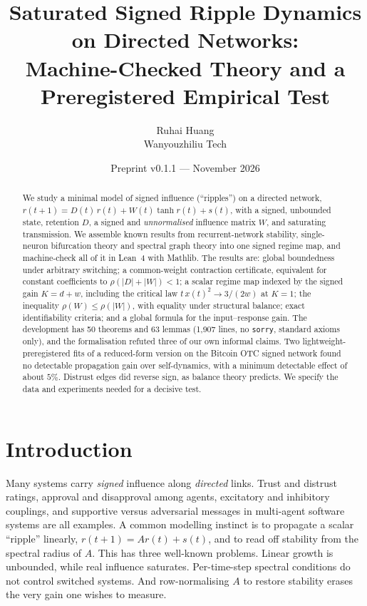 \documentclass[11pt]{article}
\title{Saturated Signed Ripple Dynamics on Directed Networks:\\
Machine-Checked Theory and a Preregistered Empirical Test}
\author{Ruhai Huang\\ \small Wanyouzhiliu Tech}
\date{Preprint v0.1.1 --- November 2026}
\theoremstyle{definition}
\theoremstyle{remark}
\begin{document}
\maketitle

\begin{abstract}
We study a minimal model of signed influence (``ripples'') on a directed network,
$r(t+1)=D(t)\,r(t)+W(t)\tanh r(t)+s(t)$, with a signed, unbounded state, retention $D$, a signed and
\emph{unnormalised} influence matrix $W$, and saturating transmission. We assemble known results from
recurrent-network stability, single-neuron bifurcation theory and spectral graph theory into one signed
regime map, and machine-check all of it in Lean~4 with Mathlib. The results are: global boundedness
under arbitrary switching; a common-weight contraction certificate, equivalent for constant
coefficients to $\rho(|D|+|W|)<1$; a scalar regime map indexed by the signed gain $K=d+w$, including the
critical law $t\,x(t)^2\to3/(2w)$ at $K=1$; the inequality $\rho(W)\le\rho(|W|)$, with equality under
structural balance; exact identifiability criteria; and a global formula for the input--response gain.
The development has 50 theorems and 63 lemmas (1{,}907 lines, no \texttt{sorry}, standard axioms only),
and the formalisation refuted three of our own informal claims. Two lightweight-preregistered fits of a
reduced-form version on the Bitcoin OTC signed network found no detectable propagation gain over
self-dynamics, with a minimum detectable effect of about $5\%$. Distrust edges did reverse sign, as
balance theory predicts. We specify the data and experiments needed for a decisive test.
\end{abstract}

\section{Introduction}

Many systems carry \emph{signed} influence along \emph{directed} links. Trust and distrust ratings, approval
and disapproval among agents, excitatory and inhibitory couplings, and supportive versus adversarial
messages in multi-agent software systems are all examples. A common modelling instinct is to propagate a
scalar ``ripple'' linearly, $r(t+1)=Ar(t)+s(t)$, and to read off stability from the spectral radius of
$A$. This has three well-known problems. Linear growth is unbounded, while real influence saturates.
Per-time-step spectral conditions do not control switched systems. And row-normalising $A$ to restore
stability erases the very gain one wishes to measure.
\end{document}
